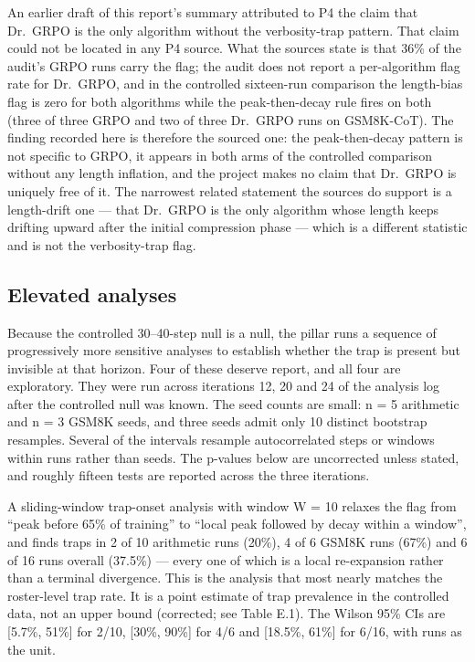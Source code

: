 \documentclass[12pt,a4paper]{report}
\begin{document}
An earlier draft of this report's summary attributed to P4 the claim
that Dr.~GRPO is the only algorithm without the verbosity-trap pattern.
That claim could not be located in any P4 source. What the sources state
is that 36\% of the audit's GRPO runs carry the flag; the audit does not
report a per-algorithm flag rate for Dr.~GRPO, and in the controlled
sixteen-run comparison the length-bias flag is zero for both algorithms
while the peak-then-decay rule fires on both (three of three GRPO and
two of three Dr.~GRPO runs on GSM8K-CoT). The finding recorded here is
therefore the sourced one: the peak-then-decay pattern is not specific
to GRPO, it appears in both arms of the controlled comparison without
any length inflation, and the project makes no claim that Dr.~GRPO is
uniquely free of it. The narrowest related statement the sources do
support is a length-drift one --- that Dr.~GRPO is the only algorithm
whose length keeps drifting upward after the initial compression phase
--- which is a different statistic and is not the verbosity-trap flag.

\subsection{Elevated analyses}\label{elevated-analyses}

Because the controlled 30--40-step null is a null, the pillar runs a
sequence of progressively more sensitive analyses to establish whether
the trap is present but invisible at that horizon. Four of these deserve
report, and all four are exploratory. They were run across iterations
12, 20 and 24 of the analysis log after the controlled null was known.
The seed counts are small: n = 5 arithmetic and n = 3 GSM8K seeds, and
three seeds admit only 10 distinct bootstrap resamples. Several of the
intervals resample autocorrelated steps or windows within runs rather
than seeds. The p-values below are uncorrected unless stated, and
roughly fifteen tests are reported across the three iterations.

A sliding-window trap-onset analysis with window W = 10 relaxes the flag
from ``peak before 65\% of training'' to ``local peak followed by decay
within a window'', and finds traps in 2 of 10 arithmetic runs (20\%), 4
of 6 GSM8K runs (67\%) and 6 of 16 runs overall (37.5\%) --- every one
of which is a local re-expansion rather than a terminal divergence. This
is the analysis that most nearly matches the roster-level trap rate. It
is a point estimate of trap prevalence in the controlled data, not an
upper bound (corrected; see Table E.1). The Wilson 95\% CIs are
{[}5.7\%, 51\%{]} for 2/10, {[}30\%, 90\%{]} for 4/6 and {[}18.5\%,
61\%{]} for 6/16, with runs as the unit.
\end{document}
